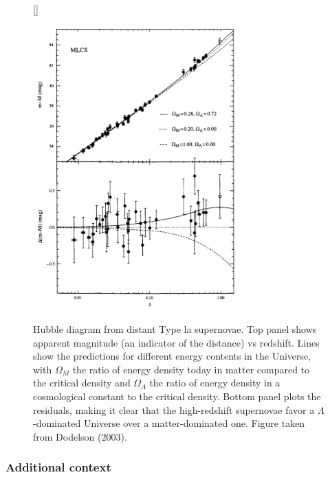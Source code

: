 \documentclass[a4paper,11pt]{article}
\begin{document}
\begin{figure}[h]
    [\FBwidth]
    {\caption{\footnotesize{Hubble diagram from distant Type la supernovae. Top panel shows apparent magnitude (an indicator of the distance) vs redshift. Lines show the predictions for different energy contents in the Universe, with $\Omega_M$ the ratio of energy density today in matter compared to the critical density and $\Omega_\Lambda$ the ratio of energy density in a cosmological constant to the critical density. Bottom panel plots the residuals, making it clear that the high-redshift supernovae favor a $\Lambda$-dominated Universe over a matter-dominated one. Figure taken from Dodelson (2003).}}
    \label{fig:hubblediagram_modern}}
    {\includegraphics[width=8cm]{figures/HubbleDiagram_modern.png}}
\end{figure}

\subsubsection{Additional context}
\end{document}
